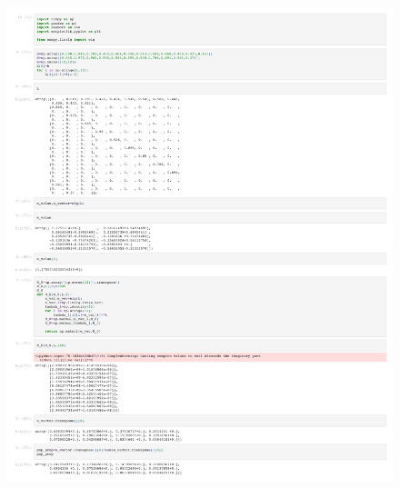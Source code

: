 \documentclass[addpoints, 11pt]{exam}
\begin{document}
\begin{questions}
\begin{figure}[H]
\end{figure}
\begin{figure}[H]
	\centering
	\includegraphics[scale=0.4]{Math_142_Homework_3_Q_2.pdf}	
\end{figure}
\begin{figure}[H]
	\centering

\end{figure}
\end{questions}
\end{document}
